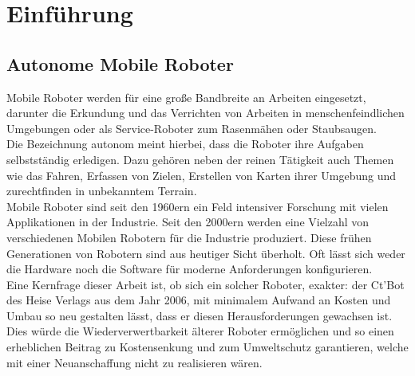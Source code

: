 \documentclass[twoside,11pt, a4paper]{report}
\begin{document}
	\renewcommand{\baselinestretch}{1.3}
	\small\normalsize
	
	\tableofcontents
	
	\renewcommand{\baselinestretch}{1}
	\small\normalsize
	
	\cleardoublepage
	
	
	
	\setcounter{page}{1}
	
	\chapter{Einführung}
	
	\section{Autonome Mobile Roboter}
	Mobile Roboter werden für eine große Bandbreite an Arbeiten eingesetzt, darunter die Erkundung und das Verrichten von Arbeiten in menschenfeindlichen Umgebungen oder als Service-Roboter zum Rasenmähen oder Staubsaugen.\\
	Die Bezeichnung autonom meint hierbei, dass die Roboter ihre Aufgaben selbstständig erledigen. Dazu gehören neben der reinen Tätigkeit auch Themen wie das Fahren, Erfassen von Zielen, Erstellen von Karten ihrer Umgebung und zurechtfinden in unbekanntem Terrain. \\
	Mobile Roboter sind seit den 1960ern ein Feld intensiver Forschung mit vielen Applikationen in der Industrie. Seit den 2000ern werden eine Vielzahl von verschiedenen Mobilen Robotern für die Industrie produziert. Diese frühen Generationen von Robotern sind aus heutiger Sicht überholt. Oft lässt sich weder die Hardware noch die Software für moderne Anforderungen konfigurieren.\\
	Eine Kernfrage dieser Arbeit ist, ob sich ein solcher Roboter, exakter: der Ct'Bot des Heise Verlags aus dem Jahr 2006, mit minimalem Aufwand an Kosten und Umbau so neu gestalten lässt, dass er diesen Herausforderungen gewachsen ist. \\
	Dies würde die Wiederverwertbarkeit älterer Roboter ermöglichen und so einen erheblichen Beitrag zu Kostensenkung und zum Umweltschutz garantieren, welche mit einer Neuanschaffung nicht zu realisieren wären. 
	
\end{document}
